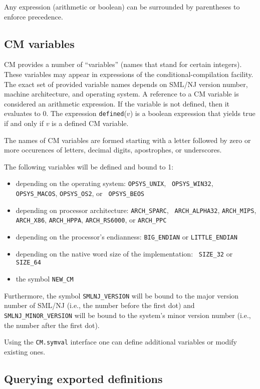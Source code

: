 \documentclass{article}
\begin{document}
Any expression (arithmetic or boolean) can be surrounded by
parentheses to enforce precedence.

\subsection{CM variables}
\label{sec:cmvars}

CM provides a number of ``variables'' (names that stand for certain
integers). These variables may appear in expressions of the
conditional-compilation facility. The exact set of provided variable
names depends on SML/NJ version number, machine architecture, and
operating system.  A reference to a CM variable is considered an
arithmetic expression. If the variable is not defined, then it
evaluates to 0.  The expression {\tt defined}($v$) is a boolean
expression that yields true if and only if $v$ is a defined CM
variable.

The names of CM variables are formed starting with a letter followed
by zero or more occurences of letters, decimal digits, apostrophes, or
underscores.

The following variables will be defined and bound to 1:
\begin{itemize}
\item depending on the operating system: {\tt OPSYS\_UNIX}, {\tt
OPSYS\_WIN32}, {\tt OPSYS\_MACOS}, {\tt OPSYS\_OS2}, or {\tt
OPSYS\_BEOS}
\item depending on processor architecture: {\tt ARCH\_SPARC}, {\tt
ARCH\_ALPHA32}, {\tt ARCH\_MIPS}, {\tt ARCH\_X86}, {\tt ARCH\_HPPA},
{\tt ARCH\_RS6000}, or {\tt ARCH\_PPC}
\item depending on the processor's endianness: {\tt BIG\_ENDIAN} or
{\tt LITTLE\_ENDIAN}
\item depending on the native word size of the implementation: {\tt
SIZE\_32} or {\tt SIZE\_64}
\item the symbol {\tt NEW\_CM}
\end{itemize}

Furthermore, the symbol {\tt SMLNJ\_VERSION} will be bound to the
major version number of SML/NJ (i.e., the number before the first dot)
and {\tt SMLNJ\_MINOR\_VERSION} will be bound to the system's minor
version number (i.e., the number after the first dot).

Using the {\tt CM.symval} interface one can define additional
variables or modify existing ones.

\subsection{Querying exported definitions}
\end{document}
